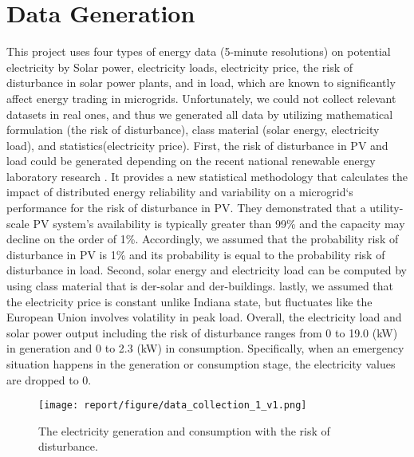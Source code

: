 \documentclass[conference]{IEEEtran}
\begin{document}
\section{Data Generation}
This project uses four types of energy data (5-minute resolutions) on potential electricity by Solar power, electricity loads, electricity price, the risk of disturbance in solar power plants, and in load, which are known to significantly affect energy trading in microgrids. Unfortunately, we could not collect relevant datasets in real ones, and thus we generated all data by utilizing mathematical formulation (the risk of disturbance), class material (solar energy, electricity load), and statistics(electricity price). 
First, the risk of disturbance in PV and load could be generated depending on the recent national renewable energy laboratory research \cite{b1}. It provides a new statistical methodology that calculates the impact of distributed energy reliability and variability on a microgrid`s performance for the risk of disturbance in PV. They demonstrated that a utility-scale PV system's availability is typically greater than 99\% and the capacity may decline on the order of 1\%. Accordingly, we assumed that the probability risk of disturbance in PV is 1\% and its probability is equal to the probability risk of disturbance in load. Second, solar energy and electricity load can be computed by using class material that is der-solar and der-buildings. lastly, we assumed that the electricity price is constant unlike Indiana state, but fluctuates like the European Union involves volatility in peak load. Overall, the electricity load and solar power output including the risk of disturbance ranges from 0 to 19.0 (kW) in generation and 0 to 2.3 (kW) in consumption. Specifically, when an emergency situation happens in the generation or consumption stage, the electricity values are dropped to 0. 
\begin{figure}[htbp]
    \centering
    \texttt{[image: report/figure/data\_collection\_1\_v1.png]}
    \caption{The electricity generation and consumption with the risk of disturbance.}
    \label{fig:1}
\end{figure}
\end{document}
